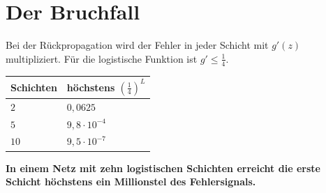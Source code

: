 \section{Der Bruchfall}

\begin{warnung}
Bei der Rückpropagation wird der Fehler in jeder Schicht mit $g'(z)$ multipliziert. Für die logistische Funktion ist $g' \le \tfrac14$.

\begin{center}
{\small
\renewcommand{\arraystretch}{1.46}
\begin{tabular}{@{}P{2.0cm}P{3.0cm}@{}}
\toprule
\textbf{Schichten} & \textbf{höchstens $(\tfrac14)^{L}$}\\
\midrule
$2$ & $0{,}0625$\\
$5$ & $9{,}8\cdot10^{-4}$\\
$10$ & $9{,}5\cdot10^{-7}$\\
\bottomrule
\end{tabular}}
\end{center}

\begin{center}
\begin{minipage}{0.9\textwidth}
\textbf{In einem Netz mit zehn logistischen Schichten erreicht die erste Schicht höchstens ein Millionstel des Fehlersignals.}
\end{minipage}
\end{center}

\begin{center}
\begin{minipage}{0.88\textwidth}
\end{minipage}
\end{center}
\end{warnung}

